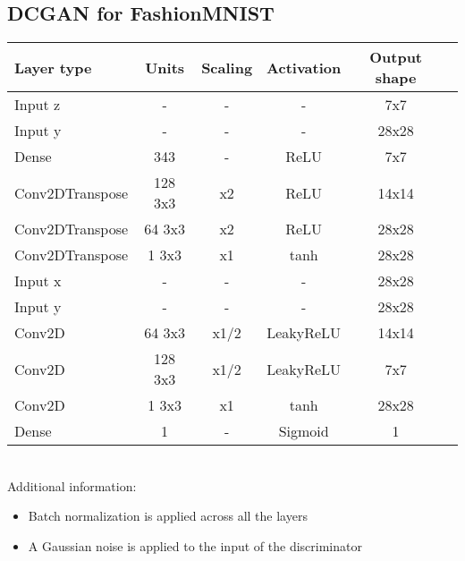 {\subsection{DCGAN for FashionMNIST}
{
	\centering
	\begin{tabular}{|l|c|c|c|c|c|}
		\hline
		Layer type & Units & Scaling & Activation & Output shape\\
		\hline
		Input z & - & - & - & 7x7\\
		Input y & - & - & - & 28x28\\
		Dense & 343 & - & ReLU & 7x7\\
		Conv2DTranspose & 128 3x3 & x2 & ReLU & 14x14 \\
		Conv2DTranspose & 64 3x3 & x2 & ReLU & 28x28 \\
		Conv2DTranspose & 1 3x3 & x1 & tanh & 28x28 \\
		\hline
		Input x & - & - & - & 28x28\\
		Input y & - & - & - & 28x28\\
		Conv2D & 64 3x3 & x1/2 & LeakyReLU & 14x14 \\
		Conv2D & 128 3x3 & x1/2 & LeakyReLU & 7x7 \\
		Conv2D & 1 3x3 & x1 & tanh & 28x28 \\
		Dense & 1 & - & Sigmoid & 1\\
		\hline
	\end{tabular}
}\\ 

Additional information: \begin{itemize}
	\item Batch normalization \citep{Ioffe2015} is applied across all the layers
	\item A Gaussian noise is applied to the input of the discriminator
\end{itemize}

}
